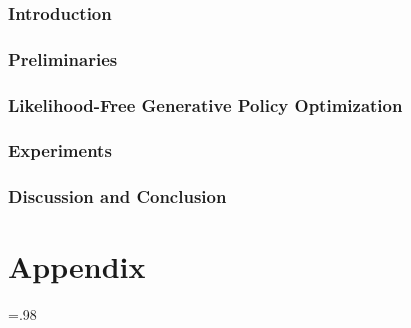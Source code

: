 \documentclass[12pt]{article}
\numberwithin{equation}{section}
\begin{document}
\section{Introduction}
\label{sec:intro}



\section{Preliminaries}
\label{sec:background}



\section{Likelihood-Free Generative Policy Optimization}
\label{sec:method}



\section{Experiments}
\label{sec:exp}


\section{Discussion and Conclusion}
\label{sec:conclusion}


% 

% 



\appendix
\label{sec:append}
\part*{Appendix}
{
\setlength{\parskip}{-0em}
\startcontents[sections]
}



\clearpage
\def\arxivfont{\rm}
%



\baselineskip=.98\baselineskip
\let\originalthebibliography\thebibliography
\renewcommand\thebibliography[1]{
  \originalthebibliography{#1}
  \setlength{\itemsep}{0pt plus 0.3ex}
}
\fi


\end{document}
